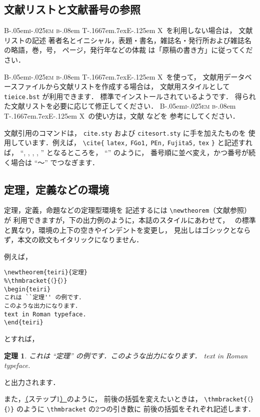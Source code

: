 \documentclass[technicalreport]{ieicej}
\def\BibTeX{{\rmfamily B\kern-.05em{\scshape i\kern-.025em b}\kern-.08em
 T\kern-.1667em\lower.7ex\hbox{E}\kern-.125em X}}
\begin{document}
\subsection{文献リストと文献番号の参照}

\BibTeX\ を利用しない場合は，
文献リストの記述\ddash 
著者名とイニシャル，表題・書名，雑誌名・発行所および雑誌名の略語，巻，号，
ページ，発行年などの体裁\ddash 
は「原稿の書き方」に従ってください．

\BibTeX\ を使って，
文献用データベースファイルから文献リストを作成する場合は，
文献用スタイルとして \texttt{tieice.bst} が利用できます．
標準でインストールされているようです．
得られた文献リストを必要に応じて修正してください．
\BibTeX\ の使い方は，文献 \cite{latex,FMi1,Okumura3} などを
参考にしてください．

文献引用のコマンドは，
\texttt{cite.sty} および \texttt{citesort.sty} に手を加えたものを
使用しています．例えば，
\verb/\cite{/\allowbreak
\texttt{latex,}\allowbreak
\texttt{FGo1,}\allowbreak
\texttt{PEn,}\allowbreak
\texttt{Fujita5,}\allowbreak
\texttt{tex}\allowbreak
\verb/}/ と記述すれば，
``\cite{latex}, \cite{FGo1}, \cite{PEn}, 
\cite{Fujita5}, \cite{tex}'' となるところを，
``\cite{latex,FGo1,PEn,Fujita5,tex}'' のように，
番号順に並べ変え，かつ番号が続く場合は ``〜'' でつなぎます．

\subsection{定理，定義などの環境}

定理，定義，命題などの定理型環境を
記述するには \verb/\newtheorem/（文献\cite{latex,FMi1}参照）が
利用できますが，下の出力例のように，本誌のスタイルにあわせて，
\LaTeXe\ の標準と異なり，環境の上下の空きやインデントを変更し，
見出しはゴシックとならず，本文の欧文もイタリックになりません．

例えば，
\begin{verbatim}
\newtheorem{teiri}{定理}
%\thmbracket{（}{）}
\begin{teiri}
これは ``定理'' の例です．
このような出力になります．
text in Roman typeface.
\end{teiri}
\end{verbatim}
とすれば，
\newtheorem{teiri}{定理}%
\begin{teiri}
これは ``定理'' の例です．このような出力になります．
text in Roman typeface.
\end{teiri}
と出力されます．

また，\underline{（}ステップ1\underline{）}のように，
前後の括弧を変えたいときは，
\verb/\thmbracket{（}{）}/ のように \verb/\thmbracket/ の2つの引き数に
前後の括弧をそれぞれ記述します．
\end{document}
